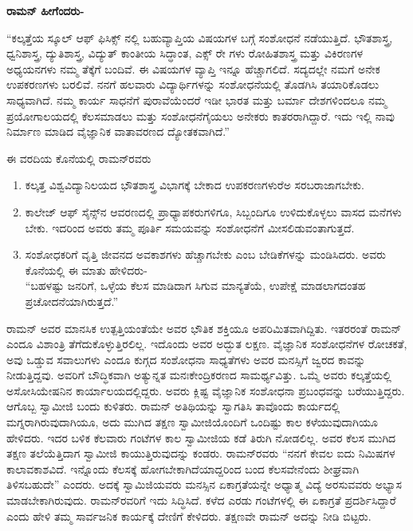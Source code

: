 \textbf{ರಾಮನ್ ಹೀಗೆಂದರು-}

“ಕಲ್ಕತ್ತೆಯ ಸ್ಕೂಲ್ ಆಫ್ ಫಿಸಿಕ್ಸ್ ನಲ್ಲಿ ಬಹುವ್ಯಾಪ್ತಿಯ ವಿಷಯಗಳ ಬಗ್ಗೆ ಸಂಶೋಧನೆ ನಡೆಯುತ್ತಿದೆ. ಭೌತಶಾಸ್ತ್ರ, ಧ್ವನಿಶಾಸ್ತ್ರ, ದ್ಯುತಿಶಾಸ್ತ್ರ, ವಿದ್ಯುತ್ ಕಾಂತೀಯ ಸಿದ್ಧಾಂತ, ಎಕ್ಸ್ ರೇ ಗಳು ರೋಹಿತಶಾಸ್ತ್ರ ಮತ್ತು ವಿಕಿರಣಗಳ ಅಧ್ಯಯನಗಳು ನಮ್ಮ ತೆಕ್ಕೆಗೆ ಬಂದಿವೆ. ಈ ವಿಷಯಗಳ ವ್ಯಾಪ್ತಿ ಇನ್ನೂ ಹೆಚ್ಚಾಗಲಿದೆ. ಸದ್ಯದಲ್ಲೇ ನಮಗೆ ಅನೇಕ ಉಪಕರಣಗಳು ಬರಲಿವೆ. ನನಗೆ ಹಲವಾರು ವಿದ್ಯಾರ್ಥಿಗಳನ್ನು ಸಂಶೋಧನೆಯಲ್ಲಿ ತೊಡಗಿಸಿ ತಯಾರಿಕೊಡಲು ಸಾಧ್ಯವಾಗಿದೆ. ನಮ್ಮ ಕಾರ್ಯ ಸಾಧನೆಗೆ ಪುರಾವೆಯೆಂದರೆ ಇಡೀ ಭಾರತ ಮತ್ತು ಬರ್ಮಾ ದೇಶಗಳಿಂದಲೂ ನಮ್ಮ ಪ್ರಯೋಗಾಲಯದಲ್ಲಿ ಕೆಲಸಮಾಡಲು ಮತ್ತು ಸಂಶೋಧನೆಗೈಯಲು ಅನೇಕರು ಕಾತರರಾಗಿದ್ದಾರೆ. ಇದು ಇಲ್ಲಿ ನಾವು ನಿರ್ಮಾಣ ಮಾಡಿದ ವೈಜ್ಞಾನಿಕ ವಾತಾವರಣದ ದ್ಯೋತಕವಾಗಿದೆ.”

ಈ ವರದಿಯ ಕೊನೆಯಲ್ಲಿ ರಾಮನ್‍ರವರು

\begin{enumerate}
\item ಕಲ್ಕತ್ತ ವಿಶ್ವವಿದ್ಯಾನಿಲಯದ ಭೌತಶಾಸ್ತ್ರ ವಿಭಾಗಕ್ಕೆ ಬೇಕಾದ ಉಪಕರಣಗಳುರೆಅ ಸರಬರಾಜಾಗಬೇಕು. 

 \item ಕಾಲೇಜ್ ಆಫ್ ಸೈನ್ಸ್‌ನ ಆವರಣದಲ್ಲಿ ಪ್ರಾಧ್ಯಾಪಕರುಗಳಿಗೂ, ಸಿಬ್ಬಂದಿಗೂ ಉಳಿದುಕೊಳ್ಳಲು ವಾಸದ ಮನೆಗಳು ಬೇಕು. ಇದರಿಂದ ಅವರು ತಮ್ಮ ಪೂರ್ತಿ ಸಮಯವನ್ನು ಸಂಶೋಧನೆಗೆ ಮೀಸಲಿಡುವಂತಾಗುತ್ತದೆ.

 \item ಸಂಶೋಧಕರಿಗೆ ವೃತ್ತಿ ಜೀವನದ ಅವಕಾಶಗಳು ಹೆಚ್ಚಾಗಬೇಕು ಎಂಬ ಬೇಡಿಕೆಗಳನ್ನು ಮಂಡಿಸಿದರು. ಅವರು ಕೊನೆಯಲ್ಲಿ ಈ ಮಾತು ಹೇಳಿದರು- \\“ಬಹಳಷ್ಟು ಜನರಿಗೆ, ಒಳ್ಳೆಯ ಕೆಲಸ ಮಾಡಿದಾಗ ಸಿಗುವ ಮಾನ್ಯತೆಯೆ, ಉಪೇಕ್ಷೆ ಮಾಡಲಾಗದಂತಹ ಪ್ರಚೋದನೆಯಾಗಿರುತ್ತದೆ.”

\end{enumerate}

ರಾಮನ್ ಅವರ ಮಾನಸಿಕ ಉತ್ಪತ್ತಿಯಂತೆಯೇ ಅವರ ಭೌತಿಕ ಶಕ್ತಿಯೂ ಅಪರಿಮಿತವಾಗಿದ್ದಿತು. ಇತರರಂತೆ ರಾಮನ್ ಎಂದೂ ವಿಶಾಂತ್ರಿ ತೆಗೆದುಕೊಳ್ಳುತ್ತಿರಲಿಲ್ಲ. ಇದೊಂದು ಅವರ ಅದ್ಭುತ ಲಕ್ಷಣ. ವೈಜ್ಞಾನಿಕ ಸಂಶೋಧನೆಗಳ ರೋಚಕತೆ, ಅವು ಒಡ್ಡುವ ಸವಾಲುಗಳು ಎಂದೂ ಕುಗ್ಗದ ಸಂಶೋಧನಾ ಸಾಧ್ಯತೆಗಳು ಅವರ ಮನಸ್ಸಿಗೆ ಜ್ವರದ ಕಾವನ್ನು ನೀಡುತ್ತಿದ್ದವು. ಅವರಿಗೆ ಬೌದ್ಧಿಕವಾಗಿ ಅತ್ಯುನ್ನತ ಮನಃಕೇಂದ್ರಿಕರಣದ ಸಾಮರ್ಥ್ಯವಿತ್ತು. ಒಮ್ಮೆ ಅವರು ಕಲ್ಕತ್ತೆಯಲ್ಲಿ ಅಸೋಸಿಯೇಷನಿನ ಕಾರ್ಯಾಲಯದಲ್ಲಿದ್ದರು. ಅವರು ಕ್ಲಿಷ್ಟ ವೈಜ್ಞಾನಿಕ ಸಂಶೋಧನಾ ಪ್ರಬಂಧವನ್ನು ಬರೆಯುತ್ತಿದ್ದರು. ಆಗೊಬ್ಬ ಸ್ವಾಮೀಜಿ ಬಂದು ಕುಳಿತರು. ರಾಮನ್ ಅತಿಥಿಯನ್ನು ಸ್ವಾಗತಿಸಿ ತಾವೊಂದು ಕಾರ್ಯದಲ್ಲಿ ಮಗ್ನರಾಗಿರುವುದಾಗಿಯೂ, ಅದು ಮುಗಿದ ತಕ್ಷಣ ಸ್ವಾಮೀಜಿಯೊಂದಿಗೆ ಒಂದಿಷ್ಟು ಕಾಲ ಕಳೆಯುವುದಾಗಿಯೂ ಹೇಳಿದರು. ಇದರ ಬಳಿಕ ಕೆಲವಾರು ಗಂಟೆಗಳ ಕಾಲ ಸ್ವಾಮೀಜಿಯ ಕಡೆ ತಿರುಗಿ ನೋಡಲಿಲ್ಲ. ಅವರ ಕೆಲಸ ಮುಗಿದ ತಕ್ಷಣ ತಲೆಯೆತ್ತಿದಾಗ ಸ್ವಾಮೀಜಿ ಕಾಯುತ್ತಿರುವುದನ್ನು ಕಂಡರು. ರಾಮನ್‍ರವರು “ನನಗೆ ಕೇವಲ ಐದು ನಿಮಿಷಗಳ ಕಾಲಾವಕಾಶವಿದೆ. ಇನ್ನೊಂದು ಕೆಲಸಕ್ಕೆ ಹೋಗಬೇಕಾಗಿದೆಯಾದ್ದರಿಂದ ಬಂದ ಕೆಲಸವೇನೆಂದು ಶೀಘ್ರವಾಗಿ ತಿಳಿಸಬಹುದೇ” ಎಂದರು. ಅದಕ್ಕೆ ಸ್ವಾಮಿಜಿಯವರು ಮನಸ್ಸಿನ ಏಕಾಗ್ರತೆಯನ್ನೇ ಅಧ್ಯಾತ್ಮ ವಿದ್ಯೆ ಅರಸುವವರು ಅಭ್ಯಾಸ ಮಾಡಬೇಕಾಗಿರುವುದು. ರಾಮನ್‍ರವರಿಗೆ ಇದು ಸಿದ್ಧಿಸಿದೆ. ಕಳೆದ ಎರಡು ಗಂಟೆಗಳಲ್ಲಿ ಈ ಏಕಾಗ್ರತೆ ಪ್ರದರ್ಶಿಸಿದ್ದಾರೆ ಎಂದು ಹೇಳಿ ತಮ್ಮ ಸಾರ್ವಜನಿಕ ಕಾರ್ಯಕ್ಕೆ ದೇಣಿಗೆ ಕೇಳಿದರು. ತಕ್ಷಣವೇ ರಾಮನ್ ಅದನ್ನು ನೀಡಿ ಬಿಟ್ಟರು.


